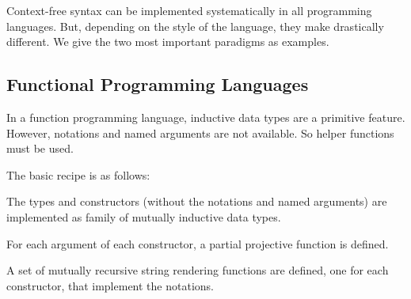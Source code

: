 Context-free syntax can be implemented systematically in all programming languages.
But, depending on the style of the language, they make drastically different.
We give the two most important paradigms as examples.

\subsection{Functional Programming Languages}

In a function programming language, inductive data types are a primitive feature.
However, notations and named arguments are not available.
So helper functions must be used.

The basic recipe is as follows:
\begin{compactitem}
\item The types and constructors (without the notations and named arguments) are implemented as family of mutually inductive data types.
\item For each argument of each constructor, a partial projective function is defined.
\item A set of mutually recursive string rendering functions are defined, one for each constructor, that implement the notations.
\end{compactitem}

